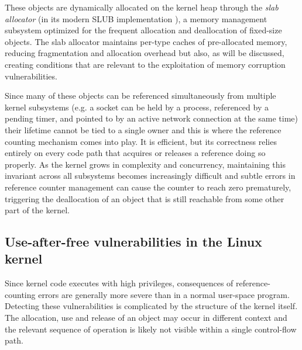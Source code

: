 These objects are dynamically allocated on the kernel heap through the \textit{slab allocator} \cite{bib:slab-allocator} (in its modern SLUB implementation \cite{bib:slub}), a memory management subsystem optimized for the frequent allocation and deallocation of fixed-size objects. The slab allocator maintains per-type caches of pre-allocated memory, reducing fragmentation and allocation overhead but also, as will be discussed, creating conditions that are relevant to the exploitation of memory corruption vulnerabilities.

Since many of these objects can be referenced simultaneously from multiple kernel subsystems (e.g. a socket can be held by a process, referenced by a pending timer, and pointed to by an active network connection at the same time) their lifetime cannot be tied to a single owner and this is where the reference counting mechanism comes into play. It is efficient, but its correctness relies entirely on every code path that acquires or releases a reference doing so properly. As the kernel grows in complexity and concurrency, maintaining this invariant across all subsystems becomes increasingly difficult and subtle errors in reference counter management can cause the counter to reach zero prematurely, triggering the deallocation of an object that is still reachable from some other part of the kernel.

\subsection{Use-after-free vulnerabilities in the Linux kernel}
Since kernel code executes with high privileges, consequences of reference-counting errors are generally more severe than in a normal user-space program. Detecting these vulnerabilities is complicated by the structure of the kernel itself. The allocation, use and release of an object may occur in different context and the relevant sequence of operation is likely not visible within a single control-flow path.

